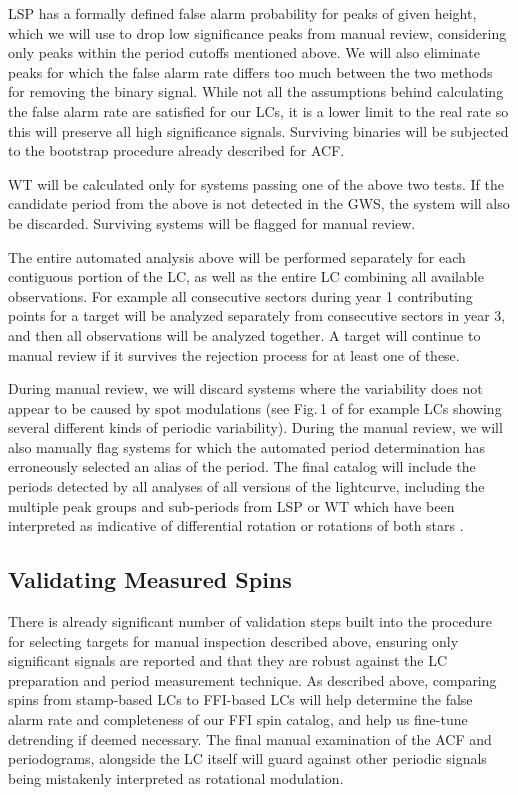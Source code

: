 LSP has a formally defined false alarm probability for peaks of given height,
which we will use to drop low significance peaks from manual review, considering
only peaks within the period cutoffs mentioned above. We will also eliminate
peaks for which the false alarm rate differs too much between the two methods
for removing the binary signal. While not all the assumptions behind calculating
the false alarm rate are satisfied for our LCs, it is a lower limit to the real
rate so this will preserve all high significance signals. Surviving binaries
will be subjected to the bootstrap procedure already described for ACF.

WT will be calculated only for systems passing one of the above two tests. If
the candidate period from the above is not detected in the GWS, the system will
also be discarded. Surviving systems will be flagged for manual review.

The entire automated analysis above will be performed separately for each
contiguous portion of the LC, as well as the entire LC combining all available
observations. For example all consecutive sectors during year 1 contributing
points for a target will be analyzed separately from consecutive sectors in year
3, and then all observations will be analyzed together. A target will continue
to manual review if it survives the rejection process for at least one of these.

During manual review, we will discard systems where the variability does not
appear to be caused by spot modulations (see Fig.\,1 of \citep{Lurie_et_al_17}
for example LCs showing several different kinds of periodic variability). During
the manual review, we will also manually flag systems for which the automated
period determination has erroneously selected an alias of the period. The final
catalog will include the periods detected by all analyses of all versions of the
lightcurve, including the multiple peak groups and sub-periods from LSP or WT
which have been interpreted as indicative of differential rotation or rotations
of both stars \citep{Rappaport_et_al_14, Reinhold_Gizon_15, Lurie_et_al_17}.

\subsection{Validating Measured Spins}
%
\label{sec:spin_validation}

There is already significant number of validation steps built into the procedure
for selecting targets for manual inspection described above, ensuring only
significant signals are reported and that they are robust against the LC
preparation and period measurement technique. As described above, comparing spins
from stamp-based LCs to FFI-based LCs will help determine the false alarm rate
and completeness of our FFI spin catalog, and help us fine-tune detrending if
deemed necessary. The final manual examination of the ACF and periodograms,
alongside the LC itself will guard against other periodic signals being
mistakenly interpreted as rotational modulation.

